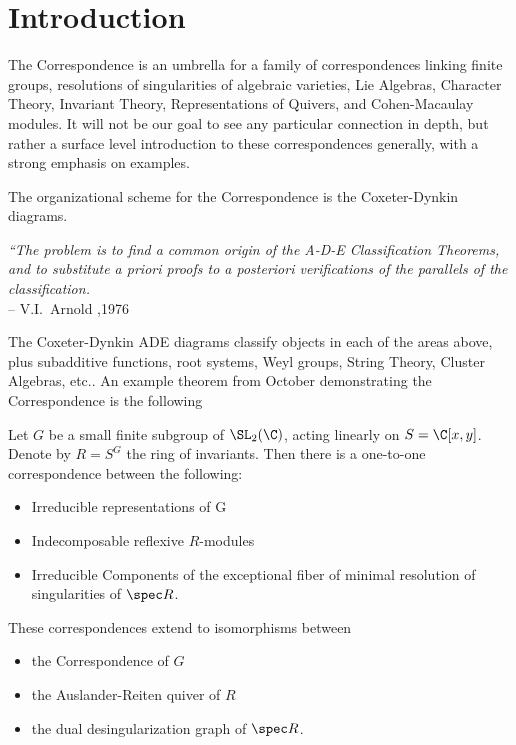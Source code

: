 \newpage
\section{Introduction}


The \mc Correspondence is an umbrella for a family of correspondences linking finite groups, resolutions of singularities of algebraic varieties, Lie Algebras, Character Theory, Invariant Theory, Representations of Quivers, and Cohen-Macaulay modules. It will not be our goal to see any particular connection in depth, but rather a surface level introduction to these correspondences generally, with a strong emphasis on examples. 


The organizational scheme for the \mc Correspondence is the Coxeter-Dynkin diagrams. \\
        \begin{nscenter}
        \begin{minipage}{0.8\textwidth}
        {\itshape ``The problem is to find a common origin of the A-D-E Classification Theorems, and to substitute a priori proofs to a posteriori verifications of the parallels of the classification.} \\
        \phantom{x}\hspace{1cm} -- V.I.~Arnold ,1976 \\
        \end{minipage}
        \end{nscenter}
The Coxeter-Dynkin ADE diagrams classify objects in each of the areas above, plus subadditive functions, root systems, Weyl groups, String Theory, Cluster Algebras, etc.. An example theorem from October demonstrating the \mc Correspondence is the following


\begin{thm}
Let $G$ be a small finite subgroup of $\SL_2(\C)$, acting linearly on $S= \C[x,y]$. Denote by $R=S^G$ the ring of invariants. Then there is a one-to-one correspondence between the following:
	\begin{itemize}
	\item Irreducible representations of G
	\item Indecomposable reflexive $R$-modules
	\item Irreducible Components of the exceptional fiber of minimal resolution of singularities of $\spec R$.
	\end{itemize}
These correspondences extend to isomorphisms between 
	\begin{itemize}
	\item the \mc Correspondence of $G$
	\item the Auslander-Reiten quiver of $R$
	\item the dual desingularization graph of $\spec R$. 
	\end{itemize}
\end{thm}



